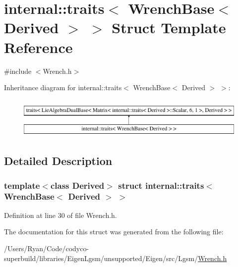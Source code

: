\hypertarget{structinternal_1_1traits_3_01_wrench_base_3_01_derived_01_4_01_4}{}\section{internal\+:\+:traits$<$ Wrench\+Base$<$ Derived $>$ $>$ Struct Template Reference}
\label{structinternal_1_1traits_3_01_wrench_base_3_01_derived_01_4_01_4}


{\ttfamily \#include $<$Wrench.\+h$>$}

Inheritance diagram for internal\+:\+:traits$<$ Wrench\+Base$<$ Derived $>$ $>$\+:\begin{figure}[H]
\begin{center}
\leavevmode
\includegraphics[height=2.000000cm]{structinternal_1_1traits_3_01_wrench_base_3_01_derived_01_4_01_4}
\end{center}
\end{figure}


\subsection{Detailed Description}
\subsubsection*{template$<$class Derived$>$\newline
struct internal\+::traits$<$ Wrench\+Base$<$ Derived $>$ $>$}



Definition at line 30 of file Wrench.\+h.



The documentation for this struct was generated from the following file\+:\begin{DoxyCompactItemize}
\item 
/\+Users/\+Ryan/\+Code/codyco-\/superbuild/libraries/\+Eigen\+Lgsm/unsupported/\+Eigen/src/\+Lgsm/\hyperlink{_wrench_8h}{Wrench.\+h}\end{DoxyCompactItemize}
